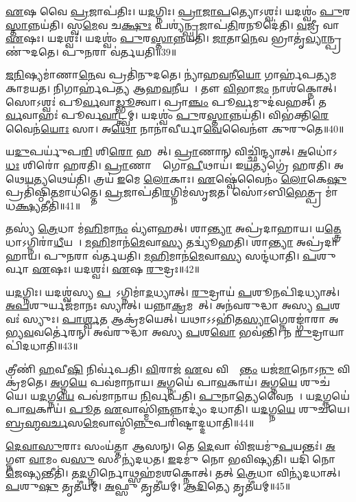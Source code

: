 \ul{𑌏}𑌷 𑌵𑍈 \ul{𑌪𑍍𑌰}𑌜𑌾𑌪॑𑌤𑌿𑌃।
𑌯\ul{𑌦}𑌗𑍍𑌨𑌿𑌃।
\ul{𑌪𑍍𑌰𑌾}\ul{𑌜𑌾}\ul{𑌪}𑌤𑍍𑌯𑍋\-𑌽𑌶𑍍𑌵𑌃॑।
𑌯𑌦𑌶𑍍𑌵𑌂॑ \ul{𑌪𑍁}𑌰\ul{𑌸𑍍𑌤𑌾}𑌨𑍍𑌨𑌯॑𑌤𑌿।
𑌸𑍍𑌵\ul{𑌮𑍇}𑌵 𑌚\ul{𑌕𑍍𑌷𑍁𑌃} 𑌪𑌶𑍍𑌯॑\ul{𑌨𑍍𑌪𑍍𑌰}𑌜𑌾𑌪॑\ul{𑌤𑌿}𑌰𑌨𑍂𑌦𑍇॑𑌤𑌿।
\ul{𑌵}𑌜𑍍𑌰𑍀 𑌵𑌾 \ul{𑌏}𑌷𑌃।
𑌯𑌦𑌶𑍍𑌵𑌃॑।
𑌯𑌦𑌶𑍍𑌵𑌂॑ \ul{𑌪𑍁}𑌰\ul{𑌸𑍍𑌤𑌾}𑌨𑍍𑌨𑌯॑𑌤𑌿।
\ul{𑌜𑌾}𑌤𑌾\ul{𑌨𑍇}𑌵 𑌭𑍍𑌰𑌾𑌤𑍃॑\ul{𑌵𑍍𑌯𑌾}𑌨𑍍𑌪𑍍𑌰𑌣𑍁॑𑌦𑌤𑍇।
𑌪𑍁\ul{𑌨}𑌰𑌾 𑌵॑𑌰𑍍𑌤𑌯𑌤𑌿॥39॥

\ul{𑌜}\ul{𑌨𑌿}𑌷𑍍𑌯𑌮𑌾॑𑌣𑌾\ul{𑌨𑍇}𑌵 𑌪𑍍𑌰𑌤𑌿॑\-𑌨𑍁𑌦𑌤𑍇।
𑌨𑍍𑌯𑌾॑𑌹\ul{𑌵}𑌨𑍀\ul{𑌯𑍋} 𑌗𑌾𑌰𑍍\mbox{}𑌹॑𑌪𑌤𑍍𑌯\-𑌮𑌕𑌾𑌮𑌯𑌤।
𑌨𑌿𑌗𑌾𑌰𑍍\mbox{}𑌹॑𑌪𑌤𑍍𑌯 𑌆𑌹\ul{𑌵}𑌨𑍀𑌯𑌮𑍍᳚।
𑌤𑍗 \ul{𑌵𑌿}𑌭𑌾\ul{𑌜𑌂} 𑌨𑌾𑌶॑𑌕𑍍𑌨𑍋𑌤𑍍।
𑌸𑍋𑌽𑌶𑍍𑌵𑌃॑ 𑌪𑍂\ul{𑌰𑍍𑌵}𑌵𑌾\ul{𑌡𑍍𑌭𑍂}𑌤𑍍𑌵𑌾।
𑌪𑍍𑌰𑌾\ul{𑌞𑍍𑌚𑌂} 𑌪𑍂\ul{𑌰𑍍𑌵}𑌮𑍁𑌦॑𑌵𑌹𑌤𑍍।
𑌤𑌤𑍍𑌪𑍂᳚\ul{𑌰𑍍𑌵}𑌵𑌾𑌹𑌃॑ 𑌪𑍂𑌰𑍍𑌵\ul{𑌵𑌾}𑌟𑍍𑌤𑍍𑌵𑌮𑍍।
𑌯𑌦𑌶𑍍𑌵𑌂॑ \ul{𑌪𑍁}𑌰\ul{𑌸𑍍𑌤𑌾}𑌨𑍍𑌨𑌯॑𑌤𑌿।
𑌵𑌿𑌭॑𑌕𑍍𑌤𑌿\-\ul{𑌰𑍇}𑌵𑍈𑌨॑\ul{𑌯𑍋𑌃} 𑌸𑌾।
𑌅\ul{𑌥𑍋} 𑌨𑌾𑌨𑌾॑𑌵𑍀𑌰𑍍𑌯𑌾\ul{𑌵𑍇}𑌵𑍈𑌨𑍗॑ 𑌕𑍁𑌰𑍁𑌤𑍇॥40॥

𑌯\ul{𑌦𑍁}𑌪𑌰𑍍𑌯𑍁॑𑌪\ul{𑌰𑌿} 𑌶𑌿\ul{𑌰𑍋} 𑌹𑌰𑍇᳚𑌤𑍍।
\ul{𑌪𑍍𑌰𑌾}𑌣𑌾𑌨𑍍‌ 𑌵𑌿𑌚𑍍𑌛𑌿॑𑌨𑍍𑌦𑍍𑌯𑌾𑌤𑍍।
\ul{𑌅}𑌧𑍋॑𑌽\ul{𑌧𑌃} 𑌶𑌿𑌰𑍋॑ 𑌹𑌰𑌤𑌿।
\ul{𑌪𑍍𑌰𑌾}𑌣𑌾𑌨𑌾𑌂᳚ 𑌗𑍋\ul{𑌪𑍀}𑌥𑌾𑌯॑।
𑌇\ul{𑌯}𑌤𑍍𑌯𑌗𑍍𑌰𑍇॑ 𑌹𑌰𑌤𑌿।
𑌅𑌥𑍇\ul{𑌯}𑌤𑍍𑌯𑌥𑍇𑌯॑𑌤𑌿।
𑌤𑍍𑌰𑌯॑ \ul{𑌇}𑌮𑍇 \ul{𑌲𑍋}𑌕𑌾𑌃।
\ul{𑌏}𑌷𑍍𑌵𑍇॑𑌵𑍈𑌨𑌂॑ \ul{𑌲𑍋}𑌕𑍇\ul{𑌷𑍁} 𑌪𑍍𑌰𑌤𑌿॑\-𑌷𑍍𑌠𑌿\ul{𑌤}𑌮𑌾𑌧॑𑌤𑍍𑌤𑍇।
\ul{𑌪𑍍𑌰}𑌜𑌾𑌪॑𑌤𑌿\ul{𑌰}𑌗𑍍𑌨𑌿𑌮॑𑌸𑍃𑌜𑌤।
𑌸𑍋॑𑌽𑌬𑌿\ul{𑌭𑍇}𑌤𑍍𑌪𑍍𑌰 𑌮𑌾॑ 𑌧\ul{𑌕𑍍𑌷𑍍𑌯}𑌤𑍀𑌤𑌿॑॥41॥

𑌤𑌸𑍍𑌯॑ \ul{𑌤𑍍𑌰𑍇}𑌧𑌾 𑌮॑\ul{𑌹𑌿}𑌮𑌾\ul{𑌨𑌂} 𑌵𑍍𑌯𑍗॑𑌹𑌤𑍍।
𑌶𑌾\ul{𑌨𑍍𑌤𑍍𑌯𑌾} 𑌅𑌪𑍍𑌰॑𑌦𑌾𑌹𑌾𑌯।
𑌯\ul{𑌤𑍍𑌤𑍍𑌰𑍇}𑌧𑌾\-𑌽𑌗𑍍𑌨𑌿𑌰𑌾॑\ul{𑌧𑍀}𑌯𑌤𑍇᳚।
\ul{𑌮}\ul{𑌹𑌿}𑌮𑌾𑌨॑\ul{𑌮𑍇}𑌵𑌾\ul{𑌸𑍍𑌯} 𑌤𑌦𑍍𑌵𑍍𑌯𑍂॑𑌹𑌤𑌿।
𑌶𑌾\ul{𑌨𑍍𑌤𑍍𑌯𑌾} 𑌅𑌪𑍍𑌰॑𑌦𑌾𑌹𑌾𑌯।
𑌪𑍁\ul{𑌨}𑌰𑌾 𑌵॑𑌰𑍍𑌤𑌯𑌤𑌿।
\ul{𑌮}\ul{𑌹𑌿}𑌮𑌾𑌨॑\ul{𑌮𑍇}𑌵𑌾\ul{𑌸𑍍𑌯} 𑌸𑌨𑍍𑌦॑𑌧𑌾𑌤𑌿।
\ul{𑌪}𑌶𑍁𑌰𑍍𑌵𑌾 \ul{𑌏}𑌷𑌃।
𑌯𑌦𑌶𑍍𑌵𑌃॑।
\ul{𑌏}𑌷 \ul{𑌰𑍁}𑌦𑍍𑌰𑌃॥42॥

𑌯\ul{𑌦}𑌗𑍍𑌨𑌿𑌃।
𑌯𑌦𑌶𑍍𑌵॑𑌸𑍍𑌯 \ul{𑌪}𑌦𑍇᳚\-𑌽𑌗𑍍𑌨𑌿𑌮𑌾॑\ul{𑌦}𑌧𑍍𑌯𑌾𑌤𑍍।
\ul{𑌰𑍁}𑌦𑍍𑌰𑌾𑌯॑ \ul{𑌪}𑌶𑍂𑌨𑌪𑌿॑\-𑌦𑌧𑍍𑌯𑌾𑌤𑍍।
\ul{𑌅}\ul{𑌪}𑌶𑍁𑌰𑍍𑌯𑌜॑𑌮𑌾𑌨𑌃 𑌸𑍍𑌯𑌾𑌤𑍍।
𑌯𑌨𑍍𑌨𑌾\ul{𑌕𑍍𑌰}𑌮𑌯𑍇᳚𑌤𑍍।
𑌅𑌨॑𑌵𑌰𑍁𑌦𑍍𑌧𑌾 𑌅𑌸𑍍𑌯 \ul{𑌪}𑌶𑌵𑌃॑ 𑌸𑍍𑌯𑍁𑌃।
\ul{𑌪𑌾}\ul{𑌰𑍍𑌶𑍍𑌵}𑌤 𑌆𑌕𑍍𑌰॑𑌮𑌯𑍇𑌤𑍍।
𑌯𑌥𑌾𑌽𑌽𑌹𑌿॑𑌤\ul{𑌸𑍍𑌯𑌾}𑌗𑍍𑌨𑍇𑌰𑌙𑍍𑌗𑌾॑𑌰𑌾 𑌅𑌭𑍍𑌯\ul{𑌵}𑌵𑌰𑍍𑌤𑍇॑𑌰𑌨𑍍।
𑌅𑌵॑𑌰𑍁𑌦𑍍𑌧𑌾 𑌅𑌸𑍍𑌯 \ul{𑌪}𑌶\ul{𑌵𑍋} 𑌭𑌵॑𑌨𑍍𑌤𑌿।
𑌨 \ul{𑌰𑍁}𑌦𑍍𑌰𑌾𑌯𑌾𑌪𑌿॑𑌦𑌧𑌾𑌤𑌿॥43॥

𑌤𑍍𑌰𑍀𑌣𑌿॑ \ul{𑌹}𑌵𑍀\ul{𑌷𑌿} 𑌨𑌿𑌰𑍍𑌵॑𑌪𑌤𑌿।
\ul{𑌵𑌿}𑌰𑌾𑌜॑ \ul{𑌏}𑌵 𑌵𑌿𑌕𑍍𑌰𑌾᳚\ul{𑌨𑍍𑌤𑌂} 𑌯𑌜॑\ul{𑌮𑌾}𑌨𑍋𑌽\ul{𑌨𑍁} 𑌵𑌿𑌕𑍍𑌰॑𑌮𑌤𑍇।
\ul{𑌅}𑌗𑍍𑌨\ul{𑌯𑍇} 𑌪𑌵॑𑌮𑌾𑌨𑌾𑌯।
\ul{𑌅}𑌗𑍍𑌨𑌯𑍇॑ 𑌪𑌾\ul{𑌵}𑌕𑌾𑌯॑।
\ul{𑌅}𑌗𑍍𑌨\ul{𑌯𑍇} 𑌶𑍁𑌚॑𑌯𑍇।
𑌯\ul{𑌦}𑌗𑍍𑌨\ul{𑌯𑍇} 𑌪𑌵॑𑌮𑌾𑌨𑌾𑌯 \ul{𑌨𑌿}𑌰𑍍𑌵𑌪॑𑌤𑌿।
\ul{𑌪𑍁}𑌨𑌾\ul{𑌤𑍍𑌯𑍇}𑌵𑍈𑌨𑌮𑍍᳚।
𑌯\ul{𑌦}𑌗𑍍𑌨𑌯𑍇॑ 𑌪𑌾\ul{𑌵}𑌕𑌾𑌯॑।
\ul{𑌪𑍂}𑌤 \ul{𑌏}𑌵𑌾𑌸𑍍𑌮𑌿॑\ul{𑌨𑍍𑌨}𑌨𑍍𑌨𑌾𑌦𑍍𑌯𑌂॑ 𑌦𑌧𑌾𑌤𑌿।
𑌯\ul{𑌦}𑌗𑍍𑌨\ul{𑌯𑍇} 𑌶𑍁𑌚॑𑌯𑍇।
\ul{𑌬𑍍𑌰}\ul{𑌹𑍍𑌮}\ul{𑌵}\ul{𑌰𑍍𑌚}𑌸\ul{𑌮𑍇}𑌵𑌾𑌸𑍍𑌮𑌿॑\ul{𑌨𑍍𑌨𑍁}𑌪𑌰𑌿॑𑌷𑍍𑌟𑌾𑌦𑍍𑌦𑌧𑌾𑌤𑌿॥44॥\anuvakamend[\ul{𑌏}\ul{𑌨}\ul{𑌮𑌾}\ul{𑌹}\ul{𑌵}𑌨𑍀𑌯𑌂॑ 𑌧𑌤𑍍𑌤𑍇\-𑌽\ul{𑌶𑍍𑌵}𑌤𑍍𑌵𑌂 𑌵॑𑌰𑍍𑌤𑌯𑌤𑌿 𑌕𑍁𑌰𑍁\ul{𑌤} 𑌇𑌤𑌿॑ \ul{𑌰𑍁}𑌦𑍍𑌰𑍋 𑌦॑𑌧𑌾\ul{𑌤𑌿} 𑌯\ul{𑌦}𑌗𑍍𑌨\ul{𑌯𑍇} 𑌶𑍁𑌚॑\ul{𑌯} 𑌏𑌕𑌂॑ 𑌚]

\ul{𑌦𑍇}\ul{𑌵𑌾}\ul{𑌸𑍁}𑌰𑌾𑌃 𑌸𑌂𑌯॑𑌤𑍍𑌤𑌾 𑌆𑌸𑌨𑍍।
𑌤𑍇 \ul{𑌦𑍇}𑌵𑌾 𑌵𑌿॑\ul{𑌜}𑌯𑌮𑍁॑\ul{𑌪}𑌯𑌨𑍍𑌤𑌃॑।
\ul{𑌅}𑌗𑍍𑌨𑍗 \ul{𑌵𑌾}𑌮𑌂 𑌵\ul{𑌸𑍁} 𑌸𑌂 𑌨𑍍𑌯॑𑌦𑌧𑌤।
\ul{𑌇}𑌦𑌮𑍁॑ 𑌨𑍋 𑌭𑌵𑌿𑌷𑍍𑌯𑌤𑌿।
𑌯𑌦𑌿॑ 𑌨𑍋 \ul{𑌜𑍇}𑌷𑍍𑌯𑌨𑍍𑌤𑍀𑌤𑌿॑।
𑌤\ul{𑌦}𑌗𑍍𑌨𑌿𑌰𑍍𑌨𑍋𑌥𑍍𑌸𑌹॑𑌮𑌶𑌕𑍍𑌨𑍋𑌤𑍍।
𑌤𑌤𑍍 \ul{𑌤𑍍𑌰𑍇}𑌧𑌾 𑌵𑌿𑌨𑍍𑌯॑𑌦𑌧𑌾𑌤𑍍।
\ul{𑌪}𑌶𑍁\ul{𑌷𑍁} 𑌤𑍃𑌤𑍀॑𑌯𑌮𑍍।
\ul{𑌅}𑌫𑍍𑌸𑍁 𑌤𑍃𑌤𑍀॑𑌯𑌮𑍍।
\ul{𑌆}\ul{𑌦𑌿}𑌤𑍍𑌯𑍇 𑌤𑍃𑌤𑍀॑𑌯𑌮𑍍॥45॥

